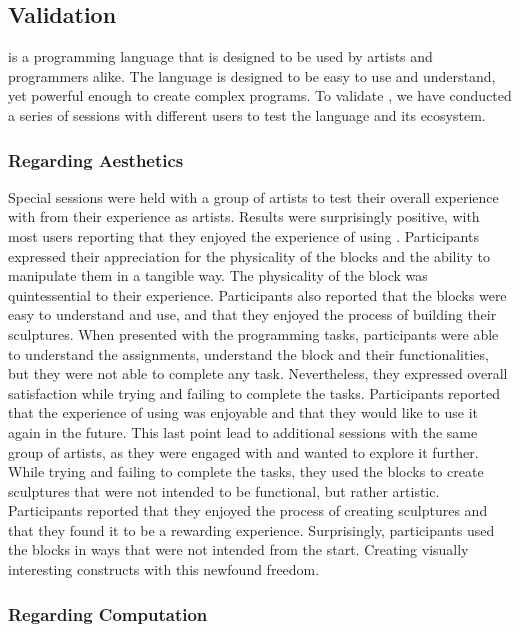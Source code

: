 \subsection{Validation}
\label{sec:results:validation}
\sculpt is a programming language that is designed to be used by artists and programmers alike.
The language is designed to be easy to use and understand, yet powerful enough to create complex programs.
To validate \sculpt, we have conducted a series of sessions with different users to test the language and its ecosystem.

\subsubsection{Regarding Aesthetics}
\label{sec:results:validation:aesthetics}
Special sessions were held with a group of artists to test their overall experience with \sculpt from their experience as artists.
Results were surprisingly positive, with most users reporting that they enjoyed the experience of using \sculpt.
Participants expressed their appreciation for the physicality of the blocks and the ability to manipulate them in a tangible way.
The physicality of the block was quintessential to their experience.
Participants also reported that the blocks were easy to understand and use, and that they enjoyed the process of building their sculptures.
When presented with the programming tasks, participants were able to understand the assignments, understand the block and their functionalities, but they were not able to complete any task.
Nevertheless, they expressed overall satisfaction while trying and failing to complete the tasks.
Participants reported that the experience of using \sculpt was enjoyable and that they would like to use it again in the future.
This last point lead to additional sessions with the same group of artists, as they were engaged with \sculpt and wanted to explore it further.
While trying and failing to complete the tasks, they used the blocks to create sculptures that were not intended to be functional, but rather artistic.
Participants reported that they enjoyed the process of creating sculptures and that they found it to be a rewarding experience.
Surprisingly, participants used the blocks in ways that were not intended from the start. Creating visually interesting constructs with this newfound freedom.


\subsubsection{Regarding Computation}
